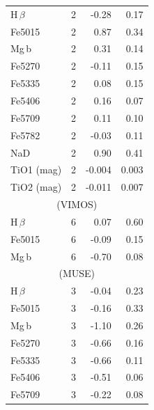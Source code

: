 \documentclass[a4paper,fleqn,usenatbib]{mnras}
\begin{document}
\begin{table}
\begin{tabular}{l r r r}
				\hline
				H\,$\beta$ 	& 2 		& -0.28\leavevmode\phantom{0}& 0.17\leavevmode\phantom{0}	\\ 
				Fe5015 		& 2 		& 0.87\leavevmode\phantom{0}& 0.34\leavevmode\phantom{0}	\\ 
				Mg\,b 		& 2 		& 0.31\leavevmode\phantom{0}& 0.14\leavevmode\phantom{0}	\\
				Fe5270 		& 2 		& -0.11\leavevmode\phantom{0}& 0.15\leavevmode\phantom{0}	\\
				Fe5335 		& 2 		& 0.08\leavevmode\phantom{0}& 0.15\leavevmode\phantom{0}	\\
				Fe5406 		& 2 		& 0.16\leavevmode\phantom{0}& 0.07\leavevmode\phantom{0}	\\
				Fe5709 		& 2 		& 0.11\leavevmode\phantom{0}& 0.10\leavevmode\phantom{0}	\\
				Fe5782 		& 2 		& -0.03\leavevmode\phantom{0}& 0.11\leavevmode\phantom{0}	\\
				NaD 		& 2 		& 0.90\leavevmode\phantom{0}& 0.41\leavevmode\phantom{0}	\\
				TiO1 (mag)	& 2 		& -0.004	& 0.003	\\
				TiO2 (mag)	& 2 		& -0.011	& 0.007	\\
				\hline
				\multicolumn{4}{c}{\citet{Ogando2008} (VIMOS)} \\
				\hline
				H\,$\beta$ 	& 6 		& 0.07\leavevmode\phantom{0}& 0.60\leavevmode\phantom{0}	\\
				Fe5015 		& 6 		& -0.09\leavevmode\phantom{0}& 0.15\leavevmode\phantom{0}	\\
				Mg\,b 		& 6 		& -0.70\leavevmode\phantom{0}& 0.08\leavevmode\phantom{0}	\\
				\hline
				\multicolumn{4}{c}{\citet{Ogando2008} (MUSE)} \\
				\hline
				H\,$\beta$ 	& 3 		& -0.04\leavevmode\phantom{0}& 0.23\leavevmode\phantom{0}	\\ 
				Fe5015 		& 3 		& -0.16\leavevmode\phantom{0}& 0.33\leavevmode\phantom{0}	\\ 
				Mg\,b 		& 3 		& -1.10\leavevmode\phantom{0}& 0.26\leavevmode\phantom{0}	\\
				Fe5270 		& 3 		& -0.66\leavevmode\phantom{0}& 0.16\leavevmode\phantom{0}	\\
				Fe5335 		& 3 		& -0.66\leavevmode\phantom{0}& 0.11\leavevmode\phantom{0}	\\
				Fe5406 		& 3 		& -0.51\leavevmode\phantom{0}& 0.06\leavevmode\phantom{0}	\\
				Fe5709 		& 3 		& -0.22\leavevmode\phantom{0}& 0.08\leavevmode\phantom{0}	\\

\end{tabular}
\end{table}
\end{document}
